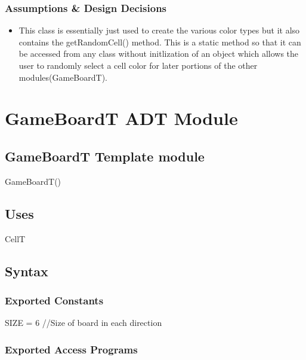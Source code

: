 \documentclass[12pt]{article}
\begin{document}
\subsubsection* {Assumptions \& Design Decisions}

\begin{itemize}
\item This class is essentially just used to create the various color types but it also contains the getRandomCell() method. This is a static method so that it can be accessed from any class without initlization of an object which allows the user to randomly select a cell color for later portions of the other modules(GameBoardT).

\end{itemize}

\newpage

\section* {GameBoardT ADT Module}

\subsection* {GameBoardT Template module}

GameBoardT()

\subsection* {Uses}

CellT

\subsection* {Syntax}


\subsubsection* {Exported Constants}

SIZE = 6 //Size of board in each direction

\subsubsection* {Exported Access Programs}
\end{document}

